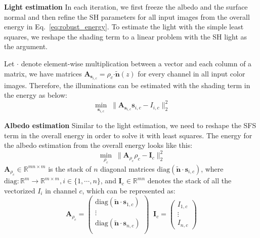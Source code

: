 \textbf{Light estimation}
In each iteration, we first freeze the albedo and the surface normal and then refine the SH parameters for all input images from the overall energy in Eq.~\ref{eq:robust_energy}.
To estimate the light with the simple least squares, we reshape the shading term to a linear problem with the SH light as the argument.

Let $\boldsymbol{\cdot}$ denote element-wise multiplication between a vector and each column of a matrix, we have matrices $\mathbf{A}_{\mathbf{s}_{i,c}} = \rho_c \boldsymbol{\cdot} \tilde{\mathbf{n}}(z)$ for every channel in all input color images. 
Therefore, the illuminations can be estimated with the shading term in the energy as below:
\begin{equation}\label{eq:robust_light_estimate2}
    \min_{\mathbf{s}_{i,c}} \; \lVert \mathbf{A}_{\mathbf{s}_{i,c}}\mathbf{s}_{i,c}  - I_{i,c} \rVert_2^2
\end{equation}

\textbf{Albedo estimation}
Similar to the light estimation, we need to reshape the SFS term in the overall energy in order to solve it with least squares.
The energy for the albedo estimation from the overall energy looks like this:
\begin{equation}\label{eq:robust_albedo_estimate}
    \min_{\rho_c} \; \lVert \mathbf{A}_{\rho_c}\rho_c - \mathbf{I}_c \rVert^2_2 
\end{equation}
$ \mathbf{A}_{\rho_c} \in \mathbb{R}^{mn \times m}$ is the stack of $n$ diagonal matrices $\text{diag}(\tilde{\mathbf{n}} \cdot \mathbf{s}_{i,c})$, where $\text{diag} : \mathbb{R}^m \rightarrow \mathbb{R}^{m\times m}, i \in \{1, \cdots, n\}$, and $\mathbf{I}_c \in \mathbb{R}^{mn}$ denotes the stack of all the vectorized $I_i$ in channel $c$, which can be represented as:
\begin{equation}
    \mathbf{A}_{\rho_c} = \begin{pmatrix} \text{diag}(\tilde{\mathbf{n}} \cdot \mathbf{s}_{1,c}) \\ \vdots \\ \text{diag}(\tilde{\mathbf{n}} \cdot \mathbf{s}_{n,c})\\\end{pmatrix} \; \;
    \mathbf{I}_c = \begin{pmatrix} I_{1,c} \\ \vdots \\ I_{n,c} \end{pmatrix}
\end{equation}

